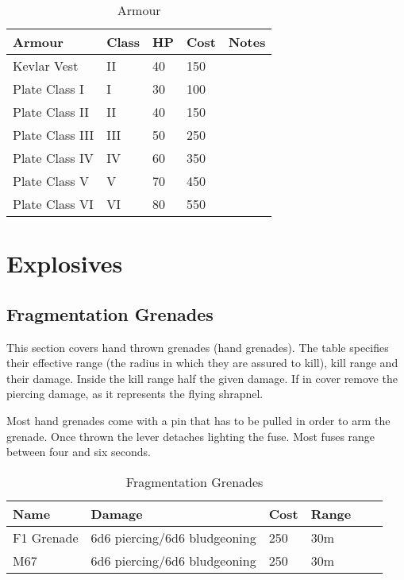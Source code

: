 \begin{table}
  \caption{Armour}
  \begin{center}
    \begin{tabular}{| l | l | l | l | l |}

      \hline
      \textbf{Armour} & \textbf{Class} & \textbf{HP} &
      \textbf{Cost} & \textbf{Notes} \\ \hline

      Kevlar Vest     &  II & 40 & 150 & \\ \hline
      Plate Class I   &   I & 30 & 100 & \\ \hline
      Plate Class II  &  II & 40 & 150 & \\ \hline
      Plate Class III & III & 50 & 250 & \\ \hline
      Plate Class IV  &  IV & 60 & 350 & \\ \hline
      Plate Class V   &   V & 70 & 450 & \\ \hline
      Plate Class VI  &  VI & 80 & 550 & \\ \hline

    \end{tabular}
  \end{center}
\end{table}

\section{Explosives}

\subsection{Fragmentation Grenades}

This section covers hand thrown grenades (hand grenades). The table specifies
their effective range (the radius in which they are assured to kill), kill
range and their damage. Inside the kill range half the given damage. If in
cover remove the piercing damage, as it represents the flying shrapnel.

Most hand grenades come with a pin that has to be pulled in order to arm the
grenade. Once thrown the lever detaches lighting the fuse. Most fuses range
between four and six seconds.

\begin{table}
  \caption{Fragmentation Grenades}
  \begin{center}
    \begin{tabular}{| l | l | l | l | l | l |}

      \hline
      \textbf{Name} & \textbf{Damage} & \textbf{Cost} & \textbf{Range} \\ \hline

      F1 Grenade  & 6d6 piercing/6d6 bludgeoning & 250 & 30m \\ \hline
      M67         & 6d6 piercing/6d6 bludgeoning & 250 & 30m \\ \hline

    \end{tabular}
  \end{center}
\end{table}

